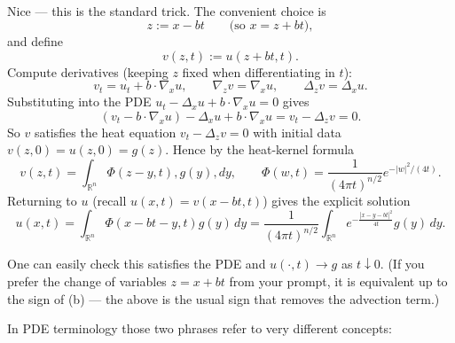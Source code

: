\documentclass[12pt,a4paper]{report}
\begin{document}
\HLINE \\
Nice — this is the standard trick. The convenient choice is
$$
z := x - bt \qquad\bigl(\text{so }x=z+bt\bigr),
$$
and define
$$
v(z,t):=u(z+bt,t).
$$
Compute derivatives (keeping $z$ fixed when differentiating in $t$):
$$
v_t = u_t + b\cdot\nabla_x u,\qquad \nabla_z v=\nabla_x u,\qquad \Delta_z v=\Delta_x u.
$$
Substituting into the PDE $u_t-\Delta_x u+b\cdot\nabla_x u=0$ gives
$$
(v_t - b\cdot\nabla_x u) - \Delta_x u + b\cdot\nabla_x u = v_t-\Delta_z v =0.
$$
So $v$ satisfies the heat equation $v_t-\Delta_z v=0$ with initial data $v(z,0)=u(z,0)=g(z)$. Hence by the heat-kernel formula
$$
v(z,t)=\int_{\mathbb{R}^n}\Phi(z-y,t),g(y),dy,\qquad
\Phi(w,t)=\frac{1}{(4\pi t)^{n/2}}e^{-|w|^2/(4t)}.
$$
Returning to $u$ (recall $u(x,t)=v(x-bt,t)$) gives the explicit solution
$$
\boxed{u(x,t)=\int_{\mathbb{R}^n}\Phi(x-bt-y,t )g(y)\,dy
= \frac{1}{(4\pi t)^{n/2}} \int_{\mathbb{R}^n}
e^{-\frac{|x-y-bt|^2}{4t}}g(y)\,dy. }
$$

One can easily check this satisfies the PDE and $u(\cdot,t)\to g$ as $t\downarrow 0$. (If you prefer the change of variables $z=x+bt$ from your prompt, it is equivalent up to the sign of (b) — the above is the usual sign that removes the advection term.)

\newpage
In PDE terminology those two phrases refer to very different concepts:
\end{document}
